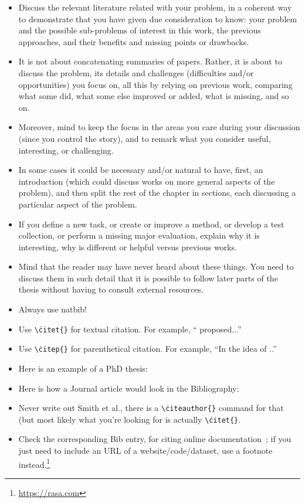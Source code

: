 {\begin{itemize}
    \item Discuss the relevant literature related with your problem, in a coherent way to demonstrate that you have given due consideration to know: your problem and the possible sub-problems of interest in this work, the previous approaches, and their benefits and missing points or drawbacks.
    \item It is not about concatenating summaries of papers. Rather, it is about to discuss the problem, its details and challenges (difficulties and/or opportunities) you focus on, all this by relying on previous work, comparing what some did, what some else improved or added, what is missing, and so on.
    \item Moreover, mind to keep the focus in the areas you care during your discussion (since you control the story), and to remark what you consider useful, interesting, or challenging.
    \item In some cases it could be necessary and/or natural to have, first, an introduction (which could discuss works on more general aspects of the problem), and then split the rest of the chapter in sections, each discussing a particular aspect of the problem.
    \item If you define a new task, or create or improve a method, or develop a test collection, or perform a missing major evaluation, explain why it is interesting, why is different or helpful versus previous works.
    \item Mind that the reader may have never heard about these things. You need to discuss them in such detail that it is possible to follow later parts of the thesis without having to consult external resources.
    \item Always use natbib!
    \item Use \texttt{\textbackslash\.citet\{\}} for textual citation. For example, ``\citet{Balog:2018:Book} proposed...''
    \item Use \texttt{\textbackslash\.citep\{\}} for parenthetical citation. For example, ``In \citep{Zhang:2020:KDD} the idea of ..''
    \item Here is an example of a PhD thesis:  \citet{Maxwell:2019:PhDThesis} 
    \item Here is how a Journal article would look in the Bibliography: \citet{Sanderson:2010:FnTIR}
    \item Never write out Smith et al., there is a \texttt{\textbackslash\.citeauthor{}\{\}} command for that (but most likely what you're looking for is actually \texttt{\textbackslash\.citet\{\}}.
    \item Check the corresponding Bib entry, for citing online documentation~\citep{Rasa:2022:doc}; if you just need to include an URL of a website/code/dataset, use a footnote instead.\footnote{\url{https://rasa.com}}
\end{itemize}
}

